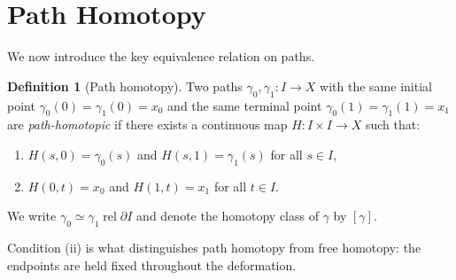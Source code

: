 \documentclass[12pt,a4paper,openany]{book}
\theoremstyle{definition}
\newtheorem{definition}{Definition}[chapter]
\theoremstyle{plain}
\theoremstyle{remark}
\newcommand{\rel}{\operatorname{rel}}
\begin{document}
\begin{center}
\label{fig:concatenation}
\end{center}


\section{Path Homotopy}\label{sec:path-homotopy}

We now introduce the key equivalence relation on paths.

\begin{definition}[Path homotopy]\label{def:path-homotopy}
Two paths $\gamma_0, \gamma_1 \colon I \to X$ with the same initial point
$\gamma_0(0) = \gamma_1(0) = x_0$ and the same terminal point $\gamma_0(1) =
\gamma_1(1) = x_1$ are \emph{path-homotopic} if there
exists a continuous map $H \colon I \times I \to X$ such that:
\begin{enumerate}[label=(\roman*)]
\item $H(s, 0) = \gamma_0(s)$ and $H(s, 1) = \gamma_1(s)$ for all $s \in I$,
\item $H(0, t) = x_0$ and $H(1, t) = x_1$ for all $t \in I$.
\end{enumerate}
We write $\gamma_0 \simeq \gamma_1 \rel{\partial I}$ and denote the homotopy
class of $\gamma$ by $[\gamma]$.
\end{definition}

Condition (ii) is what distinguishes path homotopy from free homotopy: the
endpoints are held fixed throughout the deformation.
\end{document}
